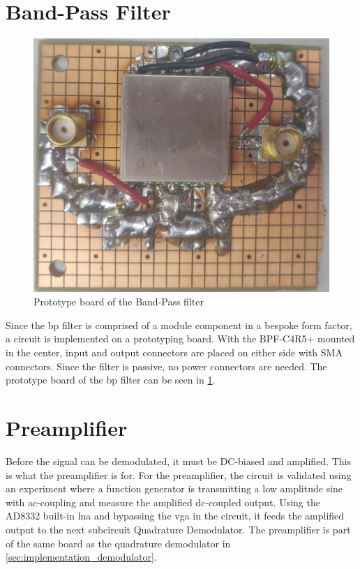 \section{Band-Pass Filter}
\begin{figure}[htbp]
	\centering
	\includegraphics[width=.8\textwidth]{Figures/4_bpf_pcb_pic.jpg}
	\caption{Prototype board of the Band-Pass filter}
	\label{fig:4_bpf_pcb_pic}
\end{figure}
Since the \gls{bp} filter is comprised of a module component in a bespoke form factor, a circuit is implemented on a prototyping board. With the BPF-C4R5+ mounted in the center, input and output connectors are placed on either side with SMA connectors. Since the filter is passive, no power connectors are needed. The prototype board of the \gls{bp} filter can be seen in \cref{fig:4_bpf_pcb_pic}.

\section{Preamplifier}
Before the signal can be demodulated, it must be DC-biased and amplified. This is what the preamplifier is for. For the preamplifier, the circuit is validated using an experiment where a function generator is transmitting a low amplitude sine with ac-coupling and measure the amplified dc-coupled output. Using the AD8332 built-in \gls{lna} and bypassing the \gls{vga} in the circuit, it feeds the amplified output to the next subcircuit Quadrature Demodulator. The preamplifier is part of the same board as the quadrature demodulator in \cref{sec:implementation_demodulator}.

